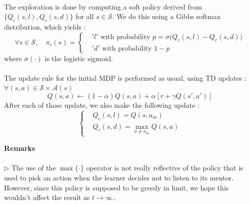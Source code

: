\documentclass[a4paper]{report}
\begin{document}
{{{{			\paragraph{} The exploration is done by computing a soft policy derived from $\{Q_c(s,l), Q_c(s,d)\}$ for all $s\in\mathcal{S}$. We do this using a Gibbs softmax distribution, which yields : 
			\begin{equation}
				\forall s \in\mathcal{S}, \quad \pi_c(s) = 
					\left\{
						\begin{aligned}
							&'l' \text{ with probability } p=\sigma\big(Q_c(s,l) - Q_c(s,d) \big) \\
							& 'd'  \text{ with probability } 1-p
						\end{aligned}
					\right.
			\end{equation}
			where $\sigma(\cdot)$ is the logistic sigmoid. 
			
			\paragraph{} The update rule for the initial MDP is performed as usual, using TD updates : $\forall{(s,a)}\in\mathcal{S}\times\mathcal{A}(s)$
			\begin{equation}
				Q(s,a) \leftarrow (1-\alpha)Q(s,a) + \alpha \left[ r + \gamma Q(s',a')\right]
			\end{equation}
			After each of those update, we also make the following update : 
			\begin{equation}
				\left\{
				\begin{aligned}
					&Q_c(s,l) = Q(s,a_m) \\
					&Q_c(s,d) = \max_{a\neq a_m} Q(s,a) 
				\end{aligned}
				\right.
			\end{equation}
		
			\vspace{10pt}
			\noindent \textbf{Remarks}\\ 
			\vspace{3pt}
		
			\hfill
			\begin{minipage}{0.95\linewidth}
				\begin{leftbar}
						\paragraph{} \noindent $\triangleright$ The use of the $\max\{\cdot\}$ operator is not really reflective of the policy that is used to pick an action when the learner decides not to listen to its mentor. However, since this policy is supposed to be greedy in limit, we hope this wouldn't affect the result as $t\to\infty$.. \\

\end{leftbar}
\end{minipage}}}}}
\end{document}

